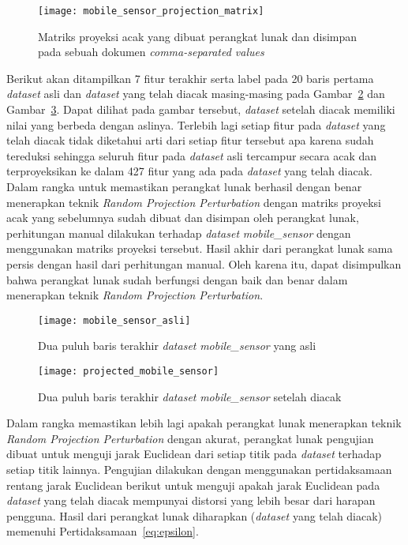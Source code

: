 \begin{figure}
	\centering
	\texttt{[image: mobile\_sensor\_projection\_matrix]}
	\caption{Matriks proyeksi acak yang dibuat perangkat lunak dan disimpan pada sebuah dokumen \textit{comma-separated values}}
	\label{fig:mobile_sensor_projection_matrix}
\end{figure}

Berikut akan ditampilkan 7 fitur terakhir serta label pada 20 baris pertama \textit{dataset} asli dan \textit{dataset} yang telah diacak masing-masing pada Gambar~\ref{fig:mobile_sensor_asli} dan Gambar~\ref{fig:projected_mobile_sensor}. Dapat dilihat pada gambar tersebut, \textit{dataset} setelah diacak memiliki nilai yang berbeda dengan aslinya. Terlebih lagi setiap fitur pada \textit{dataset} yang telah diacak tidak diketahui arti dari setiap fitur tersebut apa karena sudah tereduksi sehingga seluruh fitur pada \textit{dataset} asli tercampur secara acak dan terproyeksikan ke dalam 427 fitur yang ada pada \textit{dataset} yang telah diacak. Dalam rangka untuk memastikan perangkat lunak berhasil dengan benar menerapkan teknik \textit{Random Projection Perturbation} dengan matriks proyeksi acak yang sebelumnya sudah dibuat dan disimpan oleh perangkat lunak, perhitungan manual dilakukan terhadap \textit{dataset} \textit{mobile\_sensor} dengan menggunakan matriks proyeksi tersebut. Hasil akhir dari perangkat lunak sama persis dengan hasil dari perhitungan manual. Oleh karena itu, dapat disimpulkan bahwa perangkat lunak sudah berfungsi dengan baik dan benar dalam menerapkan teknik \textit{Random Projection Perturbation}.

\begin{figure}
	\centering
	\texttt{[image: mobile\_sensor\_asli]}
	\caption{Dua puluh baris terakhir \textit{dataset} \textit{mobile\_sensor} yang asli}
	\label{fig:mobile_sensor_asli}
\end{figure}

\begin{figure}
	\centering
	\texttt{[image: projected\_mobile\_sensor]}
	\caption{Dua puluh baris terakhir \textit{dataset} \textit{mobile\_sensor} setelah diacak}
	\label{fig:projected_mobile_sensor}
\end{figure}

Dalam rangka memastikan lebih lagi apakah perangkat lunak menerapkan teknik \textit{Random Projection Perturbation} dengan akurat, perangkat lunak pengujian dibuat untuk menguji jarak Euclidean dari setiap titik pada \textit{dataset} terhadap setiap titik lainnya. Pengujian dilakukan dengan menggunakan pertidaksamaan rentang jarak Euclidean berikut untuk menguji apakah jarak Euclidean pada \textit{dataset} yang telah diacak mempunyai distorsi yang lebih besar dari harapan pengguna. Hasil dari perangkat lunak diharapkan (\textit{dataset} yang telah diacak) memenuhi Pertidaksamaan~\ref{eq:epsilon}.


